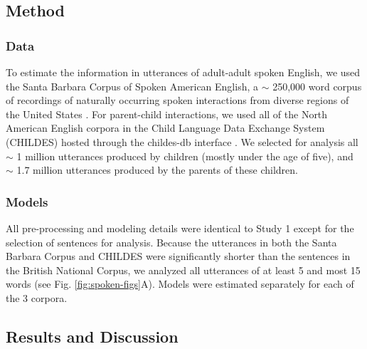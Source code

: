 \documentclass[entropy,article,submit,moreauthors,pdftex]{mdpi}
\begin{document}
\hypertarget{method-1}{%
\subsection{Method}\label{method-1}}

\hypertarget{data-1}{%
\subsubsection{Data}\label{data-1}}

To estimate the information in utterances of adult-adult spoken English,
we used the Santa Barbara Corpus of Spoken American English, a \(\sim\)
250,000 word corpus of recordings of naturally occurring spoken
interactions from diverse regions of the United States
\citep{du-bois2000}. For parent-child interactions, we used all of the
North American English corpora in the Child Language Data Exchange
System (CHILDES) hosted through the childes-db interface
\citep{macwhinney2000, sanchez2019}. We selected for analysis all
\(\sim\) 1 million utterances produced by children (mostly under the age
of five), and \(\sim\) 1.7 million utterances produced by the parents of
these children.

\hypertarget{models-1}{%
\subsubsection{Models}\label{models-1}}

All pre-processing and modeling details were identical to Study 1 except
for the selection of sentences for analysis. Because the utterances in
both the Santa Barbara Corpus and CHILDES were significantly shorter
than the sentences in the British National Corpus, we analyzed all
utterances of at least 5 and most 15 words (see Fig.
\ref{fig:spoken-figs}A). Models were estimated separately for each of
the 3 corpora.

\hypertarget{results-and-discussion-1}{%
\subsection{Results and Discussion}\label{results-and-discussion-1}}
\end{document}
